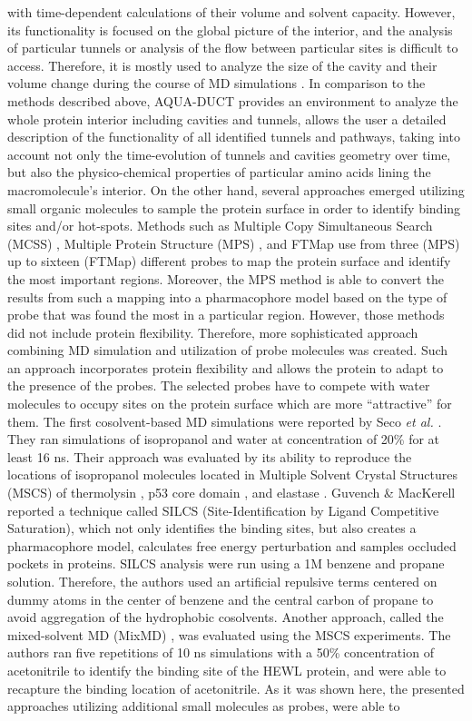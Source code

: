 \documentclass[9pt,tutorial, pubversion]{livecoms}
\begin{document}
with time-dependent calculations of their volume and solvent capacity. However, its functionality is focused on the global picture of the interior, and the analysis of particular tunnels or analysis of the flow between particular sites is difficult to access. Therefore, it is mostly used to analyze the size of the cavity and their volume change during the course of MD simulations \cite{Mitusinska2020}.
In comparison to the methods described above, AQUA-DUCT provides an environment to analyze the whole protein interior including cavities and tunnels, allows the user a detailed description of the functionality of all identified tunnels and pathways, taking into account not only the time-evolution of tunnels and cavities geometry over time, but also the physico-chemical properties of particular amino acids lining the macromolecule's interior.
On the other hand, several approaches emerged utilizing small organic molecules to sample the protein surface in order to identify binding sites and/or hot-spots. Methods such as Multiple Copy Simultaneous Search (MCSS) \cite{Miranker1991}, Multiple Protein Structure (MPS) \cite{Carlson1999,Lerner2008}, and  FTMap \cite{Brenke2009} use from three (MPS) up to sixteen (FTMap) different probes to map the protein surface and identify the most important regions. Moreover, the MPS method is able to convert the results from such a mapping into a pharmacophore model based on the type of probe that was found the most in a particular region. However, those methods did not include protein flexibility. Therefore, more sophisticated approach combining MD simulation and utilization of probe molecules was created. Such an approach incorporates protein flexibility and allows the protein to adapt to the presence of the probes. The selected probes have to compete with water molecules to occupy sites on the protein surface which are more “attractive” for them. The first cosolvent-based MD simulations were reported by Seco \textit{et al.} \cite{Seco2009}. They ran simulations of isopropanol and water at concentration of 20\% for at least 16 ns. Their approach was evaluated by its ability to reproduce the locations of isopropanol molecules located in Multiple Solvent Crystal Structures (MSCS) of thermolysin \cite{English2001}, p53 core domain \cite{Ho2006}, and elastase \cite{Mattos2006}. Guvench \& MacKerell \cite{Guvench2009} reported a technique called SILCS (Site-Identification by Ligand Competitive Saturation), which not only identifies the binding sites, but also creates a pharmacophore model, calculates free energy perturbation and samples occluded pockets in proteins. SILCS analysis were run using a 1M benzene and propane solution. Therefore, the authors used an artificial repulsive terms centered on dummy atoms in the center of benzene and the central carbon of propane to avoid aggregation of the hydrophobic cosolvents. Another approach, called the mixed-solvent MD (MixMD) \cite{Lexa2011}, was evaluated using the MSCS experiments. The authors ran five repetitions of 10 ns simulations with a 50\% concentration of acetonitrile to identify the binding site of the HEWL protein, and were able to recapture the binding location of acetonitrile. As it was shown here, the presented approaches utilizing additional small molecules as probes, were able to 
\end{document}

